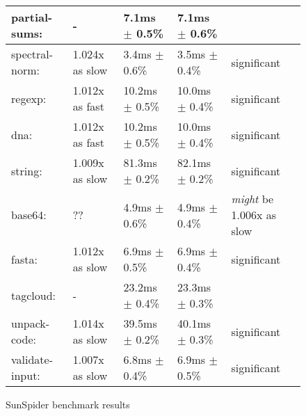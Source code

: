 \documentclass{article}
\begin{document}
\begin{figure}[H]
\begin{tabular}{|l|l|l|l|l|}
\hline\hspace{1em} partial-sums:      & -                &   7.1ms $\pm$ 0.5\% &    7.1ms $\pm$ 0.6\% & \\
\hline\hspace{1em} spectral-norm:     & 1.024x as slow &   3.4ms $\pm$ 0.6\% &    3.5ms $\pm$ 0.4\%   &  significant \\
\hline\hline
regexp:              & 1.012x as fast   &  10.2ms $\pm$ 0.5\% &   10.0ms $\pm$ 0.4\%   &  significant \\
\hline\hspace{1em} dna:               & 1.012x as fast   &  10.2ms $\pm$ 0.5\% &   10.0ms $\pm$ 0.4\%   &  significant \\
\hline\hline
string:              & 1.009x as slow &  81.3ms $\pm$ 0.2\% &   82.1ms $\pm$ 0.2\%   &  significant \\
\hline\hspace{1em} base64:            & ??               &   4.9ms $\pm$ 0.6\% &    4.9ms $\pm$ 0.4\%   &  \textit{might} be 1.006x as slow \\
\hline\hspace{1em} fasta:             & 1.012x as slow &   6.9ms $\pm$ 0.5\% &    6.9ms $\pm$ 0.4\%   &  significant \\
\hline\hspace{1em} tagcloud:          & -                &  23.2ms $\pm$ 0.4\% &   23.3ms $\pm$ 0.3\% & \\
\hline\hspace{1em} unpack-code:       & 1.014x as slow &  39.5ms $\pm$ 0.2\% &   40.1ms $\pm$ 0.3\%   &  significant \\
\hline\hspace{1em} validate-input:    & 1.007x as slow &   6.8ms $\pm$ 0.4\% &    6.9ms $\pm$ 0.5\%   &  significant  \\
\hline
\end{tabular}
\caption{SunSpider benchmark results}
\label{fig:sunspider}
\end{figure}
\end{document}
